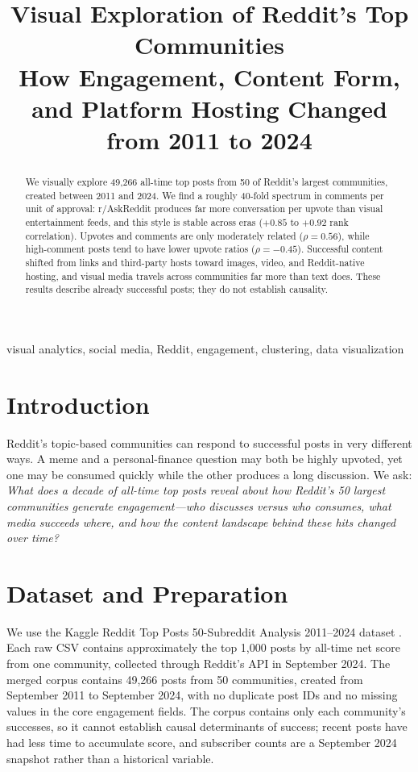 \documentclass[conference]{IEEEtran}
\title{Visual Exploration of Reddit's Top Communities\\
How Engagement, Content Form, and Platform Hosting Changed from 2011 to 2024}
\author{
\IEEEauthorblockN{Sidhanth Prabhu, Shrey Modi, and Parthsarathi Samanta}
\IEEEauthorblockA{
DAS732 Data Visualization, Term 1 (2026--27)\\
International Institute of Information Technology Bangalore\\
\{BT2024027, BT2024125, BT2024083\}}
}
\begin{document}
\maketitle

\begin{abstract}
We visually explore 49,266 all-time top posts from 50 of Reddit's largest communities, created between 2011 and 2024. We find a roughly 40-fold spectrum in comments per unit of approval: r/AskReddit produces far more conversation per upvote than visual entertainment feeds, and this style is stable across eras ($+0.85$ to $+0.92$ rank correlation). Upvotes and comments are only moderately related ($\rho=0.56$), while high-comment posts tend to have lower upvote ratios ($\rho=-0.45$). Successful content shifted from links and third-party hosts toward images, video, and Reddit-native hosting, and visual media travels across communities far more than text does. These results describe already successful posts; they do not establish causality.
\end{abstract}

\begin{IEEEkeywords}
visual analytics, social media, Reddit, engagement, clustering, data visualization
\end{IEEEkeywords}

\section{Introduction}
Reddit's topic-based communities can respond to successful posts in very different ways. A meme and a personal-finance question may both be highly upvoted, yet one may be consumed quickly while the other produces a long discussion. We ask: \emph{What does a decade of all-time top posts reveal about how Reddit's 50 largest communities generate engagement---who discusses versus who consumes, what media succeeds where, and how the content landscape behind these hits changed over time?}

\section{Dataset and Preparation}
We use the Kaggle Reddit Top Posts 50-Subreddit Analysis 2011--2024 dataset \cite{kaggle}. Each raw CSV contains approximately the top 1,000 posts by all-time net score from one community, collected through Reddit's API in September 2024. The merged corpus contains 49,266 posts from 50 communities, created from September 2011 to September 2024, with no duplicate post IDs and no missing values in the core engagement fields. The corpus contains only each community's successes, so it cannot establish causal determinants of success; recent posts have had less time to accumulate score, and subscriber counts are a September 2024 snapshot rather than a historical variable.
\end{document}
